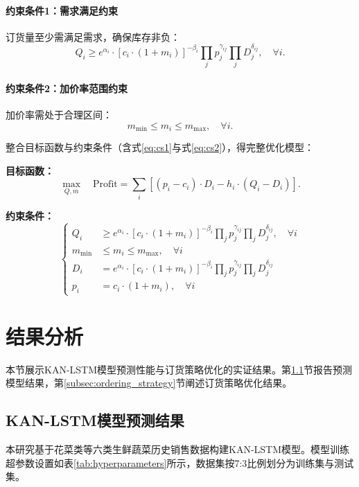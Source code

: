 \documentclass[lang=cn,12pt,a4paper]{elegantpaper}
\begin{document}
\paragraph{约束条件1：需求满足约束}
订货量至少需满足需求，确保库存非负：
\begin{equation}
Q_i \geq e^{\alpha_i} \cdot \left[ c_i \cdot (1 + m_i) \right]^{-\beta_i} \prod_j p_j^{\gamma_{ij}} \prod_j D_j^{\delta_{ij}}, \quad \forall i.
\end{equation}

\paragraph{约束条件2：加价率范围约束}
加价率需处于合理区间：
\begin{equation}
m_{\text{min}} \leq m_i \leq m_{\text{max}}, \quad \forall i.
\end{equation}


整合目标函数与约束条件（含式\eqref{eq:cs1}与式\eqref{eq:cs2}），得完整优化模型：

\textbf{目标函数：}
\begin{equation}
\max_{Q, m} \quad \text{Profit} = \sum_i \left[ (p_i - c_i) \cdot D_i - h_i \cdot (Q_i - D_i) \right].
\end{equation}

\textbf{约束条件：}
\begin{equation}
\begin{cases}
Q_i &\geq e^{\alpha_i} \cdot \left[ c_i \cdot (1 + m_i) \right]^{-\beta_i} \prod_j p_j^{\gamma_{ij}} \prod_j D_j^{\delta_{ij}}, \quad \forall i \\
m_{\min} &\leq m_i \leq m_{\max}, \quad \forall i \\
D_i &= e^{\alpha_i} \cdot \left[ c_i \cdot (1 + m_i) \right]^{-\beta_i} \prod_j p_j^{\gamma_{ij}} \prod_j D_j^{\delta_{ij}} \\
p_i &= c_i \cdot (1 + m_i), \quad \forall i
\end{cases}
\end{equation}
\section{结果分析}
\label{sec:results}
本节展示KAN-LSTM模型预测性能与订货策略优化的实证结果。第\ref{subsec:prediction_results}节报告预测模型结果，第\ref{subsec:ordering_strategy}节阐述订货策略优化结果。

\subsection{KAN-LSTM模型预测结果}
\label{subsec:prediction_results}
本研究基于花菜类等六类生鲜蔬菜历史销售数据构建KAN-LSTM模型。模型训练超参数设置如表\ref{tab:hyperparameters}所示，数据集按7:3比例划分为训练集与测试集。
\end{document}
